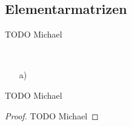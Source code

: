 \subsection{Elementarmatrizen}

\begin{Definition}
  TODO Michael
\end{Definition}

\begin{Bemerkungen}
\quad \\
  \begin{enumerate}
    \item[a)]
  \end{enumerate}
\end{Bemerkungen}

\begin{Lemma}
  TODO Michael
\end{Lemma}
\begin{proof}
  TODO Michael
\end{proof}


